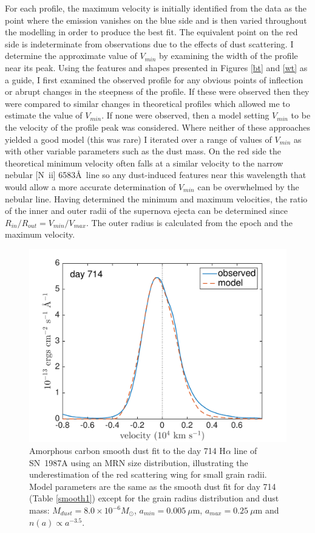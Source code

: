 For each profile, the maximum velocity is initially identified from the 
data as the point where the emission vanishes on the blue side and is then 
varied throughout the modelling in order to produce the best fit.  The 
equivalent point on the red side is indeterminate from observations due to 
the effects of dust scattering.  I determine the approximate value of 
$V_{min}$ by examining the width of the profile near its peak. Using the features and shapes presented in Figures \ref{bt} and \ref{wt} as a guide, I first examined the observed profile for any obvious points of inflection or abrupt changes in the steepness of the profile.  If these were observed then they were compared to similar changes in theoretical profiles which allowed me to estimate the value of $V_{min}$.  If none were observed, then a model setting $V_{min}$ to be the velocity of the profile peak was considered.  Where neither of these approaches yielded a good model (this was rare) I iterated over a range of values of $V_{min}$ as with other variable parameters such as the dust mass.  On the red side the theoretical minimum velocity often 
falls at a similar velocity to the narrow nebular [N~{\sc ii}] 6583\AA\ line so any dust-induced 
features near this wavelength that would allow a more accurate 
determination of $V_{min}$ can be overwhelmed by the nebular line.  
Having determined the minimum and maximum velocities, the ratio of the 
inner and outer radii of the supernova ejecta can be determined since 
$R_{in}/R_{out}=V_{min}/V_{max}$.  The outer radius is calculated from the 
epoch and the maximum velocity.
\begin{figure}
\centering
\includegraphics[trim =23 0 45 15,clip=true,scale=0.65]{chapters/chapter5/images/smooth/d714Ha_smooth_amC_MRN.pdf}
\caption{Amorphous carbon smooth dust fit to the day 714 H$\alpha$ 
line of SN~1987A using an MRN size distribution,
illustrating the underestimation of the red scattering wing for small 
grain radii.  Model parameters are the same as the smooth dust fit for 
day 714 (Table \ref{smooth1}) except for the 
grain radius distribution and dust mass:  $M_{dust}=8.0 \times 10^{-6} 
M_{\odot}$, $a_{min}=0.005~\mu$m, $a_{max}=0.25~\mu$m and $n(a) \propto 
a^{-3.5}$.}
\label{MRN}

\end{figure}

